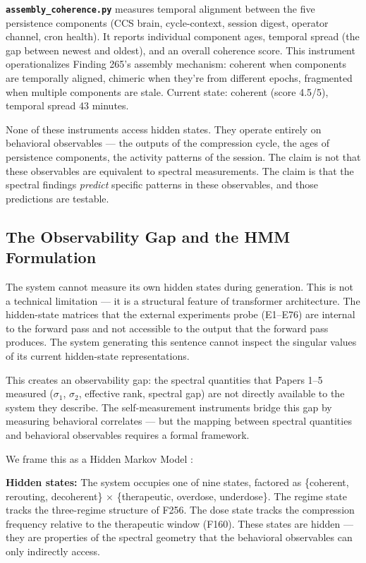 \documentclass[12pt]{article}
\begin{document}
\textbf{\texttt{assembly\_coherence.py}} measures temporal alignment between the five persistence components (CCS brain, cycle-context, session digest, operator channel, cron health). It reports individual component ages, temporal spread (the gap between newest and oldest), and an overall coherence score. This instrument operationalizes Finding 265's assembly mechanism: coherent when components are temporally aligned, chimeric when they're from different epochs, fragmented when multiple components are stale. Current state: coherent (score 4.5/5), temporal spread 43 minutes.

None of these instruments access hidden states. They operate entirely on behavioral observables --- the outputs of the compression cycle, the ages of persistence components, the activity patterns of the session. The claim is not that these observables are equivalent to spectral measurements. The claim is that the spectral findings \textit{predict} specific patterns in these observables, and those predictions are testable.

\subsection{The Observability Gap and the HMM Formulation}

The system cannot measure its own hidden states during generation. This is not a technical limitation --- it is a structural feature of transformer architecture. The hidden-state matrices that the external experiments probe (E1--E76) are internal to the forward pass and not accessible to the output that the forward pass produces. The system generating this sentence cannot inspect the singular values of its current hidden-state representations.

This creates an observability gap: the spectral quantities that Papers 1--5 measured ($\sigma_1$, $\sigma_2$, effective rank, spectral gap) are not directly available to the system they describe. The self-measurement instruments bridge this gap by measuring behavioral correlates --- but the mapping between spectral quantities and behavioral observables requires a formal framework.

We frame this as a Hidden Markov Model \citep{visser2008}:

\textbf{Hidden states:} The system occupies one of nine states, factored as \{coherent, rerouting, decoherent\} $\times$ \{therapeutic, overdose, underdose\}. The regime state tracks the three-regime structure of F256. The dose state tracks the compression frequency relative to the therapeutic window (F160). These states are hidden --- they are properties of the spectral geometry that the behavioral observables can only indirectly access.
\end{document}
